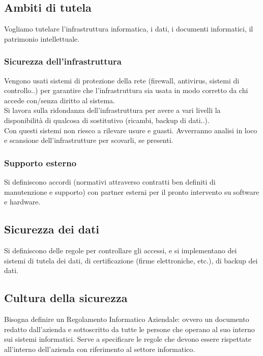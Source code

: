 \subsection{Ambiti di tutela}

Vogliamo tutelare l'infrastruttura informatica, i dati, i documenti
informatici, il patrimonio intellettuale.

\subsubsection{Sicurezza dell'infrastruttura}

Vengono usati sistemi di protezione della rete (firewall, antivirus,
sistemi di controllo..) per garantire che l'infrastruttura sia usata in
modo corretto da chi accede con/senza diritto al sistema.\\
Si lavora sulla ridondanza dell'infrastruttura per avere a vari livelli
la disponibilit\`a di qualcosa di sostitutivo (ricambi, backup di dati..).\\
Con questi sistemi non riesco a rilevare usure e guasti. Avverranno
analisi in loco e scansione dell'infrastrutture per scovarli, se
presenti.

\subsubsection{Supporto esterno}

Si definiscono accordi (normativi attraverso contratti ben definiti di
manutenzione e supporto) con partner esterni per il pronto intervento su
software e hardware.

\subsection{Sicurezza dei dati}

Si definiscono delle regole per controllare gli accessi, e si implementano dei
sistemi di tutela dei dati, di certificazione (firme elettroniche, etc.), di
backup dei dati.

\subsection{Cultura della sicurezza}

Bisogna definire un Regolamento Informatico Aziendale: ovvero un documento
redatto dall'azienda e sottoscritto da tutte le persone che operano al suo
interno sui sistemi informatici. Serve a specificare le regole che devono
essere rispettate all'interno dell'azienda con riferimento al settore
informatico.

